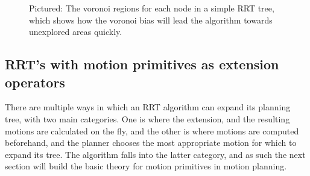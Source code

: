 \begin{figure}
  \centering {}
  \caption{Pictured: The voronoi regions for each node in a simple RRT tree,
    which shows how the voronoi bias will lead the algorithm towards unexplored
    areas quickly.}
  \label{fig:rrt-voronoi}
\end{figure}

%   

\subsection{RRT's with motion primitives as extension operators}

There are multiple ways in which an \ac{RRT} algorithm can expand its planning
tree, with two main categories. One is where the extension, and the resulting
motions are calculated on the fly, and the other is where motions are computed
beforehand, and the planner chooses the most appropriate motion for which to
expand its tree. The \rrtfunnel{} algorithm falls into the latter category, and
as such the next section will build the basic theory for motion primitives in
motion planning.

